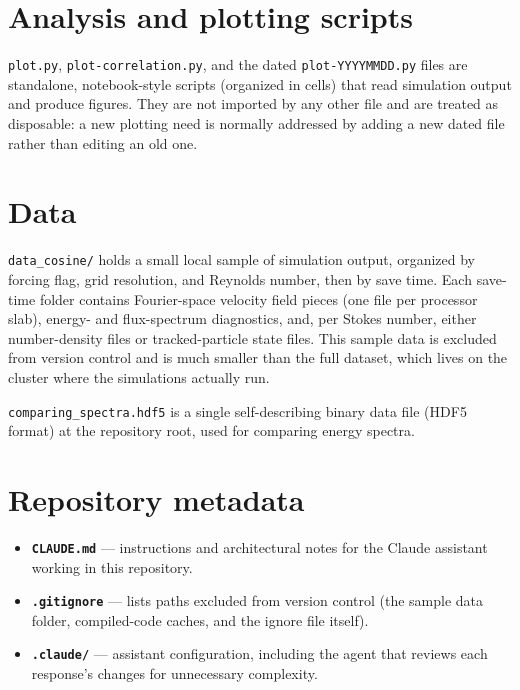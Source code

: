 \documentclass[11pt]{article}
\begin{document}
\section{Analysis and plotting scripts}
\texttt{plot.py}, \texttt{plot-correlation.py}, and the dated
\texttt{plot-YYYYMMDD.py} files are standalone, notebook-style
scripts (organized in cells) that read simulation output and produce
figures. They are not imported by any other file and are treated as
disposable: a new plotting need is normally addressed by adding a
new dated file rather than editing an old one.

\section{Data}
\texttt{data\_cosine/} holds a small local sample of simulation
output, organized by forcing flag, grid resolution, and Reynolds
number, then by save time. Each save-time folder contains
Fourier-space velocity field pieces (one file per processor slab),
energy- and flux-spectrum diagnostics, and, per Stokes number,
either number-density files or tracked-particle state files. This
sample data is excluded from version control and is much smaller
than the full dataset, which lives on the cluster where the
simulations actually run.

\texttt{comparing\_spectra.hdf5} is a single self-describing binary
data file (HDF5 format) at the repository root, used for comparing
energy spectra.

\section{Repository metadata}
\begin{itemize}[leftmargin=*]
  \item \textbf{\texttt{CLAUDE.md}} --- instructions and
    architectural notes for the Claude assistant working in this
    repository.
  \item \textbf{\texttt{.gitignore}} --- lists paths excluded from
    version control (the sample data folder, compiled-code caches,
    and the ignore file itself).
  \item \textbf{\texttt{.claude/}} --- assistant configuration,
    including the agent that reviews each response's changes for
    unnecessary complexity.
\end{itemize}
\end{document}
